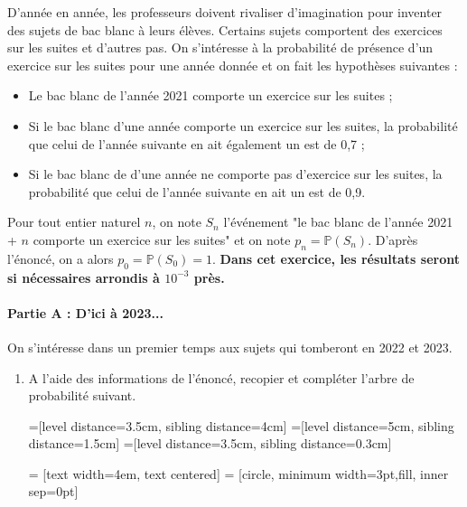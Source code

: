 \documentclass[11pt,fleqn, openany]{book} %
\begin{document}
\begin{exercise}
D'année en année, les professeurs doivent rivaliser d'imagination pour inventer des sujets de bac blanc à leurs élèves. Certains sujets comportent des exercices sur les suites et d'autres pas. On s'intéresse à la probabilité de présence d'un exercice sur les suites pour une année donnée et on fait les hypothèses suivantes :
\begin{itemize}
    \item Le bac blanc de l'année 2021 comporte un exercice sur les suites ;
    \item Si le bac blanc d'une année comporte un exercice sur les suites, la probabilité que celui de l'année suivante en ait également un est de 0,7 ;
    \item Si le bac blanc de d'une année ne comporte pas d'exercice sur les suites, la probabilité que celui de l'année suivante en ait un est de 0,9.
\end{itemize}
Pour tout entier naturel $n$, on note $S_n$ l'événement "le bac blanc de l'année 2021 + $n$ comporte un exercice sur les suites" et on note $p_n=\mathbb{P}(S_n)$. D'après l'énoncé, on a alors $p_0=\mathbb{P}(S_0)=1$. \textbf{Dans cet exercice, les résultats seront si nécessaires arrondis à $10^{-3}$ près.}


\paragraph{Partie A : D'ici à 2023...}

On s'intéresse dans un premier temps aux sujets qui tomberont en 2022 et 2023.

\begin{enumerate}
    \item A l'aide des informations de l'énoncé, recopier et compléter l'arbre de probabilité suivant.
    
=[level distance=3.5cm, sibling distance=4cm]
=[level distance=5cm, sibling distance=1.5cm]
=[level distance=3.5cm, sibling distance=0.3cm]

 = [text width=4em, text centered]
 = [circle, minimum width=3pt,fill, inner sep=0pt]



\end{enumerate}
\end{exercise}
\end{document}
